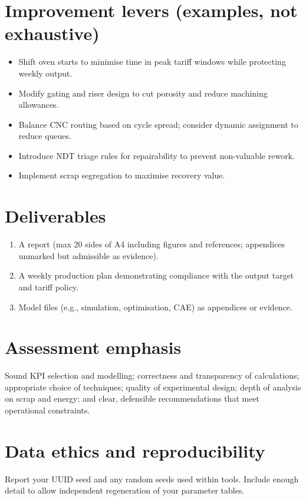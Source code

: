 \documentclass[11pt,a4paper]{article}
\begin{document}
\section*{Improvement levers (examples, not exhaustive)}
\begin{itemize}
\item Shift oven starts to minimise time in peak tariff windows while protecting weekly output.
\item Modify gating and riser design to cut porosity and reduce machining allowances.
\item Balance CNC routing based on cycle spread; consider dynamic assignment to reduce queues.
\item Introduce NDT triage rules for repairability to prevent non-valuable rework.
\item Implement scrap segregation to maximise recovery value.
\end{itemize}
\section*{Deliverables}
\begin{enumerate}
\item A report (max 20 sides of A4 including figures and references; appendices unmarked but admissible as evidence).
\item A weekly production plan demonstrating compliance with the output target and tariff policy.
\item Model files (e.g., simulation, optimisation, CAE) as appendices or evidence.
\end{enumerate}
\section*{Assessment emphasis}
Sound KPI selection and modelling; correctness and transparency of calculations; appropriate choice of techniques; quality of experimental design; depth of analysis on scrap and energy; and clear, defensible recommendations that meet operational constraints.
\section*{Data ethics and reproducibility}
Report your UUID seed and any random seeds used within tools. Include enough detail to allow independent regeneration of your parameter tables.
\end{document}
